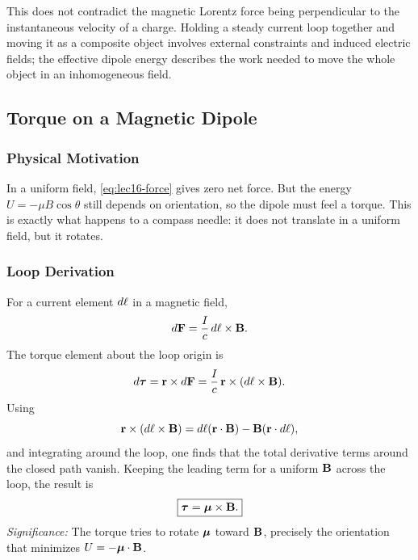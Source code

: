 \begin{remark}
  This does not contradict the magnetic Lorentz force being perpendicular to the
  instantaneous velocity of a charge.  Holding a steady current loop together and
  moving it as a composite object involves external constraints and induced electric
  fields; the effective dipole energy describes the work needed to move the whole
  object in an inhomogeneous field.
\end{remark}

\subsection{Torque on a Magnetic Dipole}\label{subsec:lec16-torque}

\subsubsection*{Physical Motivation}
In a uniform field, \eqref{eq:lec16-force} gives zero net force.  But the energy
$U=-\mu B\cos\theta$ still depends on orientation, so the dipole must feel a torque.
This is exactly what happens to a compass needle: it does not translate in a uniform
field, but it rotates.

\subsubsection*{Loop Derivation}
For a current element $d\mathbf{\ell}$ in a magnetic field,
\begin{equation}\label{eq:lec16-dF-loop}
  d\mathbf{F}=\frac{I}{c}\,d\mathbf{\ell}\times\mathbf{B}.
\end{equation}
The torque element about the loop origin is
\begin{equation}\label{eq:lec16-dtau-loop}
  d\boldsymbol{\tau}
  =\mathbf{r}\times d\mathbf{F}
  =\frac{I}{c}\,\mathbf{r}\times(d\mathbf{\ell}\times\mathbf{B}).
\end{equation}
Using
\begin{equation}\label{eq:lec16-triple-product}
  \mathbf{r}\times(d\mathbf{\ell}\times\mathbf{B})
  =d\mathbf{\ell}(\mathbf{r}\cdot\mathbf{B})-\mathbf{B}(\mathbf{r}\cdot d\mathbf{\ell}),
\end{equation}
and integrating around the loop, one finds that the total derivative terms around
the closed path vanish.  Keeping the leading term for a uniform $\mathbf{B}$ across the loop,
the result is
\begin{equation}\label{eq:lec16-torque}
  \boxed{\boldsymbol{\tau}=\boldsymbol{\mu}\times\mathbf{B}.}
\end{equation}
\textit{Significance:} The torque tries to rotate $\boldsymbol{\mu}$ toward $\mathbf{B}$, precisely the
orientation that minimizes $U=-\boldsymbol{\mu}\cdot\mathbf{B}$.

